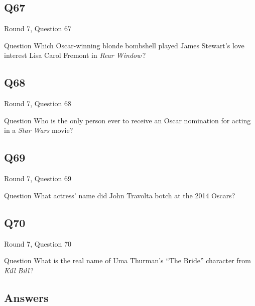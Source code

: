 \documentclass[11pt]{beamer}
\begin{document}
\subsection*{Q67}
\begin{frame}[t]{Round 7, Question 67}
\vspace{2em}
\begin{block}{Question}
Which Oscar-winning blonde bombshell played James Stewart's love interest Lisa Carol Fremont in \emph{Rear Window}\,?
\end{block}
\end{frame}
    

\subsection*{Q68}
\begin{frame}[t]{Round 7, Question 68}
\vspace{2em}
\begin{block}{Question}
Who is the only person ever to receive an Oscar nomination for acting in a \emph{Star Wars} movie?
\end{block}
\end{frame}
    

\subsection*{Q69}
\begin{frame}[t]{Round 7, Question 69}
\vspace{2em}
\begin{block}{Question}
What actress' name did John Travolta botch at the 2014 Oscars?
\end{block}
\end{frame}
    

\subsection*{Q70}
\begin{frame}[t]{Round 7, Question 70}
\vspace{2em}
\begin{block}{Question}
What is the real name of Uma Thurman's ``The Bride'' character from \emph{Kill Bill}\,?
\end{block}
\end{frame}
    
\subsection{Answers}
\end{document}
